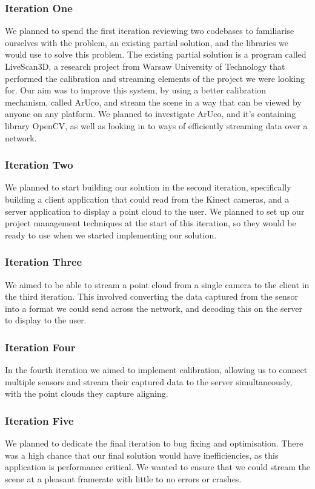 \documentclass{article}
\begin{document}
\subsubsection{Iteration One}
We planned to spend the first iteration reviewing two codebases to familiarise ourselves with the problem, an existing partial solution, and the libraries we would use to solve this problem. The existing partial solution is a program called LiveScan3D, a research project from Warsaw University of Technology that performed the calibration and streaming elements of the project we were looking for. Our aim was to improve this system, by using a better calibration mechanism, called ArUco, and stream the scene in a way that can be viewed by anyone on any platform. We planned to investigate ArUco, and it's containing library OpenCV, as well as looking in to ways of efficiently streaming data over a network.
\subsubsection{Iteration Two}
We planned to start building our solution in the second iteration, specifically building a client application that could read from the Kinect cameras, and a server application to display a point cloud to the user. We planned to set up our project management techniques at the start of this iteration, so they would be ready to use when we started implementing our solution.
\subsubsection{Iteration Three}
We aimed to be able to stream a point cloud from a single camera to the client in the third iteration. This involved converting the data captured from the sensor into a format we could send across the network, and decoding this on the server to display to the user. 
\subsubsection{Iteration Four}
In the fourth iteration we aimed to implement calibration, allowing us to connect multiple sensors and stream their captured data to the server simultaneously, with the point clouds they capture aligning.
\subsubsection{Iteration Five}
We planned to dedicate the final iteration to bug fixing and optimisation. There was a high chance that our final solution would have inefficiencies, as this application is performance critical. We wanted to ensure that we could stream the scene at a pleasant framerate with little to no errors or crashes.
\end{document}
